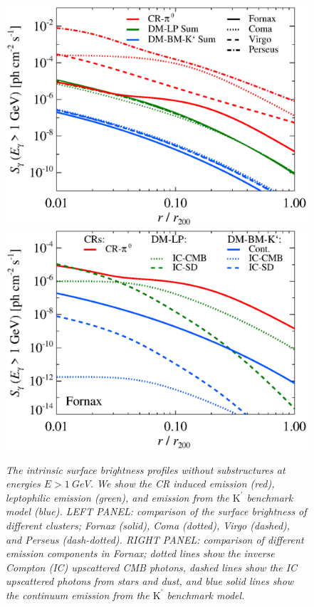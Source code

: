 \documentclass[10pt,aps,pra,reprint,amsmath,amsfonts,amssymb,showpacs,nofootinbib,floatfix]{revtex4-1}
\newcommand{\rmn}{\mathrm}
\newcommand{\Kp}{\rmn{K}^\prime}
\begin{document}
\begin{figure}
\begin{minipage}{2.0\columnwidth}
  \includegraphics[width=0.49\columnwidth]{figures/SB.v13.1GeV.SF700.noSuB.elmu.eps}
  \includegraphics[width=0.49\columnwidth]{figures/SB.fornax.v13.1GeV.SF700.noSuB.elmu.eps}
  \caption{\it The intrinsic surface brightness profiles without
    substructures at energies $E>1\ GeV$. We show the CR induced
    emission (red), leptophilic emission (green), and emission from
    the $\Kp$ benchmark model (blue).  LEFT PANEL: comparison of the surface
    brightness of different clusters; Fornax (solid), Coma (dotted),
    Virgo (dashed), and Perseus (dash-dotted). RIGHT PANEL: comparison of
    different emission components in Fornax; dotted lines show the
    inverse Compton (IC) upscattered CMB photons, dashed lines show
    the IC upscattered photons from stars and dust, and blue solid
    lines show the continuum emission from the $\Kp$ benchmark model.}
 \label{fig:SB_clu_nosub}
\end{minipage}
\end{figure}
\end{document}
